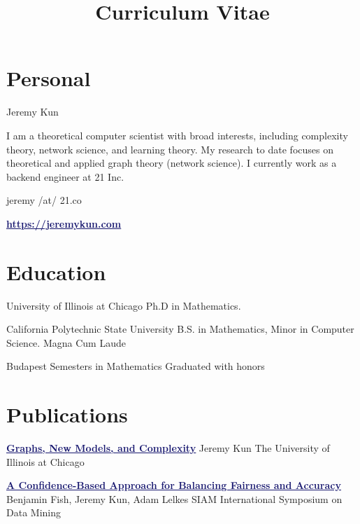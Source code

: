 \documentclass[11pt]{moderncv}
\title{Curriculum Vitae}
\begin{document}
   \maketitle

      \section{Personal}
         {Jeremy Kun}

         {I am a theoretical computer scientist with broad interests, including complexity theory, network science, and learning theory. My research to date focuses on theoretical and applied graph theory (network science). I currently work as a backend engineer at 21 Inc.}

         {jeremy /at/ 21.co}

         {\href{https://jeremykun.com}{\textcolor{MidnightBlue}{\underline{\textbf{https://jeremykun.com}}}}}


   \section{Education}
         {University of Illinois at Chicago}
      {}
      {Ph.D in Mathematics.}
{}
      {}

         {California Polytechnic State University}
      {}
      {B.S. in Mathematics, Minor in Computer Science.}
      {Magna Cum Laude}
      {}

         {Budapest Semesters in Mathematics}
      {}
{}
      {Graduated with honors}
      {}


   \section{Publications}
         {\href{http://www.levreyzin.com/papers/Kun16_phd.pdf}{\textcolor{MidnightBlue}{\underline{\textbf{Graphs, New Models, and Complexity}}}}}
      {Jeremy Kun}
      {The University of Illinois at Chicago}
      {}
      {}

         {\href{}{\textcolor{MidnightBlue}{\underline{\textbf{A Confidence-Based Approach for Balancing Fairness and Accuracy}}}}}
      {Benjamin Fish, Jeremy Kun, Adam Lelkes}
      {SIAM International Symposium on Data Mining}
      {}
      {}
\end{document}
